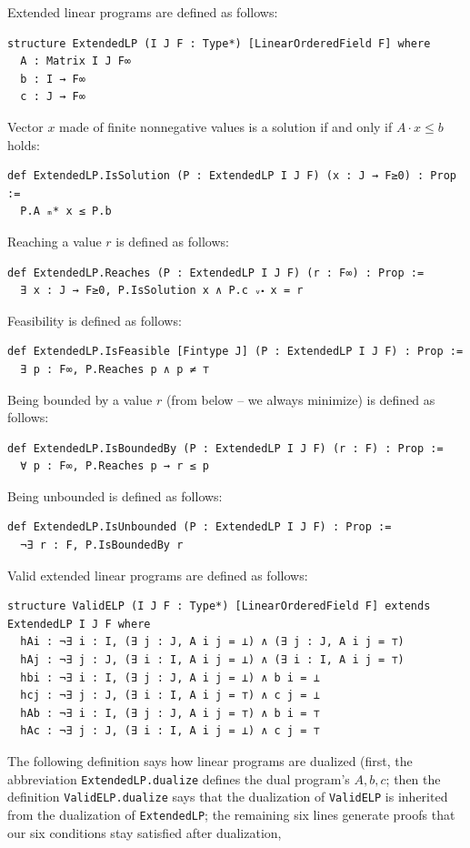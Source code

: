 \documentclass[]{article}
\renewcommand{\.}{\hskip .75pt}
\let\*=\cdot
\begin{document}
Extended linear programs are defined as follows:
\begin{lstlisting}
structure ExtendedLP (I J F : Type*) [LinearOrderedField F] where
  A : Matrix I J F∞
  b : I → F∞
  c : J → F∞
\end{lstlisting}
Vector $x$ made of finite nonnegative values is a solution if and only if $A \* x \le b$
holds:
\begin{lstlisting}
def ExtendedLP.IsSolution (P : ExtendedLP I J F) (x : J → F≥0) : Prop :=
  P.A ₘ* x ≤ P.b
\end{lstlisting}
Reaching a value $r$ is defined as follows:
\begin{lstlisting}
def ExtendedLP.Reaches (P : ExtendedLP I J F) (r : F∞) : Prop :=
  ∃ x : J → F≥0, P.IsSolution x ∧ P.c ᵥ⬝ x = r
\end{lstlisting}
Feasibility is defined as follows:
\begin{lstlisting}
def ExtendedLP.IsFeasible [Fintype J] (P : ExtendedLP I J F) : Prop :=
  ∃ p : F∞, P.Reaches p ∧ p ≠ ⊤
\end{lstlisting}
Being bounded by a value $r$ (from below -- we always minimize) is defined as follows:
\begin{lstlisting}
def ExtendedLP.IsBoundedBy (P : ExtendedLP I J F) (r : F) : Prop :=
  ∀ p : F∞, P.Reaches p → r ≤ p
\end{lstlisting}
Being unbounded is defined as follows:
\begin{lstlisting}
def ExtendedLP.IsUnbounded (P : ExtendedLP I J F) : Prop :=
  ¬∃ r : F, P.IsBoundedBy r
\end{lstlisting}
Valid extended linear programs are defined as follows:
\begin{lstlisting}
structure ValidELP (I J F : Type*) [LinearOrderedField F] extends ExtendedLP I J F where
  hAi : ¬∃ i : I, (∃ j : J, A i j = ⊥) ∧ (∃ j : J, A i j = ⊤)
  hAj : ¬∃ j : J, (∃ i : I, A i j = ⊥) ∧ (∃ i : I, A i j = ⊤)
  hbi : ¬∃ i : I, (∃ j : J, A i j = ⊥) ∧ b i = ⊥
  hcj : ¬∃ j : J, (∃ i : I, A i j = ⊤) ∧ c j = ⊥
  hAb : ¬∃ i : I, (∃ j : J, A i j = ⊤) ∧ b i = ⊤
  hAc : ¬∃ j : J, (∃ i : I, A i j = ⊥) ∧ c j = ⊤
\end{lstlisting}
The following definition says how linear programs are dualized (first, the abbreviation
\texttt{ExtendedLP.dualize} defines the dual program's $A, b, c$; then the definition
\texttt{ValidELP.dualize} says that the dualization of \texttt{ValidELP}
is inherited from the dualization of \texttt{ExtendedLP}; the remaining six lines generate
proofs that our six conditions stay satisfied after dualization,
\end{document}
